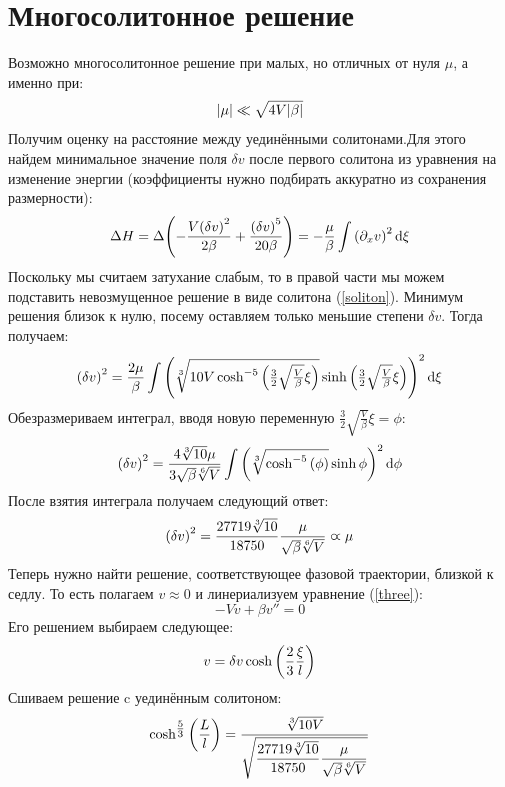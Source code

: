 \documentclass[titlepage]{article}
\begin{document}
\section{Многосолитонное решение}
Возможно многосолитонное решение при малых, но отличных от нуля $\mu$, а именно при: 
\begin{equation}
 \abs{\mu} \ll \sqrt{4V\abs{\beta}}
\end{equation}
Получим оценку на расстояние между уединёнными солитонами.Для этого найдем минимальное значение поля $\delta v$ после первого солитона из уравнения на изменение энергии (коэффициенты нужно подбирать аккуратно из сохранения размерности):
\begin{equation}
 \Delta H =  \Delta \qty(- \frac{V \qty(\delta v)^2}{2\beta} + \frac{\qty(\delta v) ^5}{20\beta}) =  - \dfrac{\mu}{\beta} \int \qty(\partial_x v)^2 \dd{\xi}
\end{equation}
Поскольку мы считаем затухание слабым, то в правой части мы можем подставить невозмущенное решение в виде солитона (\ref{soliton}). Минимум решения близок к нулю, посему оставляем только меньшие степени $\delta v$. Тогда получаем:
\begin{equation}
 \qty(\delta v)^2 =  \dfrac{2\mu}{\beta} \int \qty(\sqrt[3]{10V\cosh^{-5}{\qty(\tfrac32\sqrt{\tfrac{V}{\beta}}\xi)}}\sinh{\qty(\tfrac32\sqrt{\tfrac{V}{\beta}}\xi)} )^2 \dd{\xi}
\end{equation}
Обезразмериваем интеграл, вводя новую переменную $\tfrac32\sqrt{\tfrac{V}{\beta}}\xi = \phi$:
\begin{equation}
 \qty(\delta v)^2 =  \dfrac{4\sqrt[3]{10}\mu}{3\sqrt{\beta }\sqrt[6]{V}}  \int \qty(\sqrt[3]{\cosh^{-5}{\qty(\phi)}}\sinh{\phi} )^2 \dd{\phi}
\end{equation}
После взятия интеграла получаем следующий ответ:
\begin{equation}
 \qty(\delta v)^2 = \dfrac{27 719 \sqrt[3]{10}}{18 750} \dfrac{\mu}{\sqrt{\beta }\sqrt[6]{V}}   \varpropto \mu
\end{equation}
Теперь нужно найти решение, соответствующее фазовой траектории, близкой к седлу. То есть полагаем $v \approx 0$ и линериализуем уравнение (\ref{three}):
\begin{equation}
  -Vv + \beta v'' = 0
\end{equation}
Его решением выбираем следующее:
\begin{equation}
 v = \delta v \cosh{\qty(\dfrac23\dfrac{\xi}{l})}
\end{equation}
Сшиваем решение c уединённым солитоном:
\begin{equation}
 \cosh^{\tfrac53}{\qty(\dfrac{L}{l})} = \dfrac{\sqrt[3]{10V}}{\sqrt{\dfrac{27 719 \sqrt[3]{10}}{18 750} \dfrac{\mu}{\sqrt{\beta }\sqrt[6]{V}}}}
\end{equation}
\end{document}
